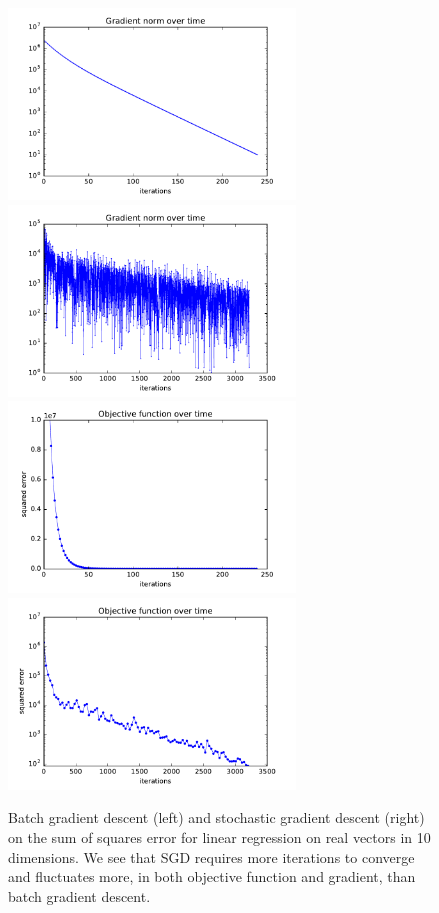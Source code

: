 \documentclass{article}
\begin{document}
\begin{multicols}{2}
\begin{figure}
   \centering
   \includegraphics[width=3in]{img/1-1-batch.pdf}
   \includegraphics[width=3in]{img/1-1-stoch.pdf}
   \includegraphics[width=3in]{img/1-1-batch-func.pdf}
   \includegraphics[width=3in]{img/1-1-stoch-func.pdf}
   \caption{Batch gradient descent (left) and stochastic gradient descent (right) on the sum of squares error for linear regression on real vectors in 10 dimensions. We see that SGD requires more iterations to converge and fluctuates more, in both objective function and gradient, than batch gradient descent.} %
   \label{fig:1.2}
\end{figure}




\end{multicols}
\end{document}
